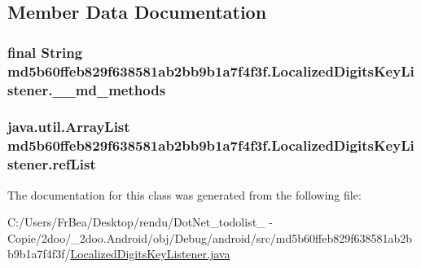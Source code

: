 \subsection{Member Data Documentation}
\hypertarget{classmd5b60ffeb829f638581ab2bb9b1a7f4f3f_1_1_localized_digits_key_listener_c9b095fc4313cfd1f41cf5978338382c}{
\subsubsection[{\_\-\_\-md\_\-methods}]{\setlength{\rightskip}{0pt plus 5cm}final String {\bf md5b60ffeb829f638581ab2bb9b1a7f4f3f.LocalizedDigitsKeyListener.\_\-\_\-md\_\-methods}}}
\label{classmd5b60ffeb829f638581ab2bb9b1a7f4f3f_1_1_localized_digits_key_listener_c9b095fc4313cfd1f41cf5978338382c}


\hypertarget{classmd5b60ffeb829f638581ab2bb9b1a7f4f3f_1_1_localized_digits_key_listener_c8f791f7f9e40c12bcd21516e34e300d}{
\subsubsection[{refList}]{\setlength{\rightskip}{0pt plus 5cm}java.util.ArrayList {\bf md5b60ffeb829f638581ab2bb9b1a7f4f3f.LocalizedDigitsKeyListener.refList}}}
\label{classmd5b60ffeb829f638581ab2bb9b1a7f4f3f_1_1_localized_digits_key_listener_c8f791f7f9e40c12bcd21516e34e300d}




The documentation for this class was generated from the following file:\begin{CompactItemize}
\item 
C:/Users/FrBea/Desktop/rendu/DotNet\_\-todolist\_ - Copie/2doo/\_\-2doo.Android/obj/Debug/android/src/md5b60ffeb829f638581ab2bb9b1a7f4f3f/\hyperlink{_localized_digits_key_listener_8java}{LocalizedDigitsKeyListener.java}\end{CompactItemize}
